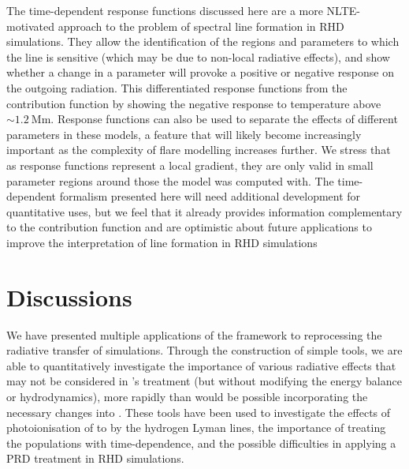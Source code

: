 The time-dependent response functions discussed here are a more NLTE-motivated approach to the problem of spectral line formation in RHD simulations.
They allow the identification of the regions and parameters to which the line is sensitive (which may be due to non-local radiative effects), and show whether a change in a parameter will provoke a positive or negative response on the outgoing radiation.
This differentiated response functions from the contribution function by showing the negative response to temperature above $\sim\SI{1.2}{\mega\m}$.
Response functions can also be used to separate the effects of different parameters in these models, a feature that will likely become increasingly important as the complexity of flare modelling increases further.
We stress that as response functions represent a local gradient, they are only valid in small parameter regions around those the model was computed with.
The time-dependent formalism presented here will need additional development for quantitative uses, but we feel that it already provides information complementary to the contribution function and are optimistic about future applications to improve the interpretation of line formation in RHD simulations

\section{Discussions}

We have presented multiple applications of the \Lw{} framework to reprocessing the radiative transfer of \Radyn{} simulations.
Through the construction of simple tools, we are able to quantitatively investigate the importance of various radiative effects that may not be considered in \Radyn{}'s treatment (but without modifying the energy balance or hydrodynamics), more rapidly than would be possible incorporating the necessary changes into \Radyn{}.
These tools have been used to investigate the effects of photoionisation of \Caii{} to \Caiii{} by the hydrogen Lyman lines, the importance of treating the \Caii{} populations with time-dependence, and the possible difficulties in applying a PRD treatment in RHD simulations.


